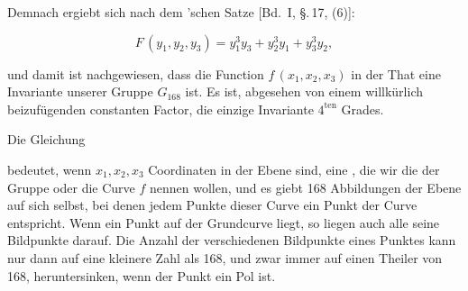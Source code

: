 Demnach ergiebt sich nach dem 'schen Satze [Bd.\ I, \S.\,17, (6)]:

\[
F\,(y_1, y_2, y_3) = y_1^3 y_3 + y_2^3 y_1 + y_3^3 y_2,
\]

und damit ist nachgewiesen, dass die Function $f\,(x_1, x_2, x_3)$ in der That eine Invariante unserer Gruppe $G_{168}$ ist. Es ist, abgesehen von einem willkürlich beizufügenden constanten Factor, die einzige Invariante $4^{\mathrm{ten}}$ Grades.

Die Gleichung


bedeutet, wenn $x_1, x_2, x_3$ Coordinaten in der Ebene sind, eine , die wir die  der Gruppe oder die Curve $f$ nennen wollen, und es giebt 168 Abbildungen der Ebene auf sich selbst, bei denen jedem Punkte dieser Curve ein Punkt der Curve entspricht. Wenn ein Punkt auf der Grundcurve liegt, so liegen auch alle seine Bildpunkte darauf. Die Anzahl der verschiedenen Bildpunkte eines Punktes kann nur dann auf eine kleinere Zahl als 168, und zwar immer auf einen Theiler von 168, heruntersinken, wenn der Punkt ein Pol ist.
